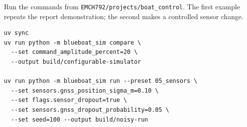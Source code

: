\documentclass[10pt,letterpaper]{article}
\begin{document}
Run the commands from \texttt{EMCH792/projects/boat\_control}. The first example repeats the report demonstration; the second makes a controlled sensor change.

\begin{minipage}{\linewidth}
\begin{verbatim}
uv sync
uv run python -m blueboat_sim compare \
  --set command_amplitude_percent=20 \
  --output build/configurable-simulator

uv run python -m blueboat_sim run --preset 05_sensors \
  --set sensors.gnss_position_sigma_m=0.10 \
  --set flags.sensor_dropout=true \
  --set sensors.gnss_dropout_probability=0.05 \
  --set seed=100 --output build/noisy-run
\end{verbatim}
\end{minipage}
\end{document}
